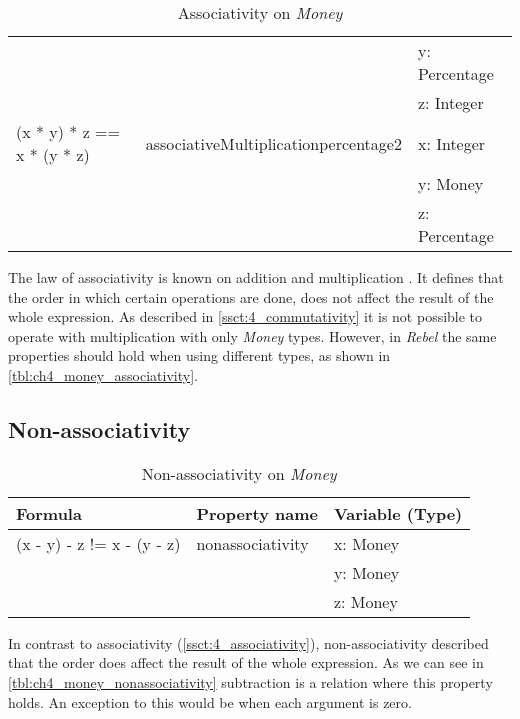 \begin{table}[!ht]
\begin{tabular}{lll}
                                                   &                                      & y: Percentage            \\
                                                   &                                      & z: Integer               \\
\rowcolor[HTML]{EFEFEF} (x * y) * z == x * (y * z) & associativeMultiplicationpercentage2 & x: Integer               \\
\rowcolor[HTML]{EFEFEF}                            &                                      & y: Money                 \\
\rowcolor[HTML]{EFEFEF}                            &                                      & z: Percentage            \\ \hline
\end{tabular}
\caption{Associativity on \textit{Money}}
\label{tbl:ch4_money_associativity}
\end{table}
\FloatBarrier
The law of associativity is known on addition and multiplication \cite{baumgart1961axioms}. It defines that the order in which certain operations are done, does not affect the result of the whole expression. As described in \autoref{ssct:4_commutativity} it is not possible to operate with multiplication with only \textit{Money} types. However, in \textit{Rebel} the same properties should hold when using different types, as shown in \autoref{tbl:ch4_money_associativity}.

\subsection*{Non-associativity}
\FloatBarrier
\begin{table}[!ht]
\centering
\begin{tabular}{lll}
\hline
                        \textbf{Formula}           & \textbf{Property name} & \textbf{Variable (Type)} \\ \hline
\rowcolor[HTML]{EFEFEF} (x - y) - z != x - (y - z) & nonassociativity       & x: Money                 \\
\rowcolor[HTML]{EFEFEF}                            &                        & y: Money                 \\
\rowcolor[HTML]{EFEFEF}                            &                        & z: Money                 \\ \hline
\end{tabular}
\caption{Non-associativity on \textit{Money}}
\label{tbl:ch4_money_nonassociativity}
\end{table}
\FloatBarrier
In contrast to associativity (\autoref{ssct:4_associativity}), non-associativity described that the order does affect the result of the whole expression. As we can see in \autoref{tbl:ch4_money_nonassociativity} subtraction is a relation where this property holds. An exception to this would be when each argument is zero.

